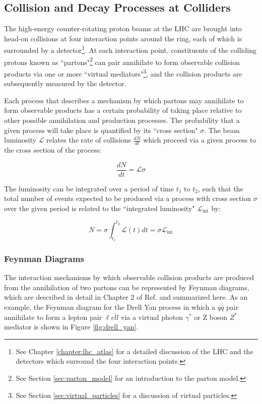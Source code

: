 \subsection{Collision and Decay Processes at Colliders}
\label{sec:col_decay_procs}

The high-energy counter-rotating proton beams at the LHC are brought into head-on collisions at four interaction points around the ring, each of which is surrounded by a detector\footnote{See Chapter \ref{chapter:lhc_atlas} for a detailed discussion of the LHC and the detectors which surround the four interaction points.}. At each interaction point, constituents of the colliding protons known as ``partons"\footnote{See Section \ref{sec:parton_model} for an introduction to the parton model.} can pair annihilate to form observable collision products via one or more ``virtual mediators"\footnote{See Section \ref{sec:virtual_particles} for a discussion of virtual particles.}, and the collision products are subsequently measured by the detector. 

Each process that describes a mechanism by which partons may annihilate to form observable products has a certain probability of taking place relative to other possible annihilation and production processes. The probability that a given process will take place is quantified by its ``cross section" \(\sigma\). The beam luminosity \(\mathcal{L}\) relates the rate of collisions \(\frac{dN}{dt}\) which proceed via a given process to the cross section of the process:

\begin{equation}
\frac{dN}{dt} = \mathcal{L}\sigma
\end{equation}

The luminosity can be integrated over a period of time \(t_1\) to \(t_2\), such that the total number of events expected to be produced via a process with cross section \(\sigma\) over the given period is related to the ``integrated luminosity" \(\mathcal{L}_\text{int}\) by:

\begin{equation}
\label{eq:integrated_lumi}
N = \sigma\int_{t_1}^{t_2}\mathcal{L}(t)dt = \sigma\mathcal{L}_\text{int}
\end{equation}

\subsubsection{Feynman Diagrams}

The interaction mechanisms by which observable collision products are produced from the annihilation of two partons can be represented by Feynman diagrams, which are described in detail in Chapter 2 of Ref. \cite{griffiths_2008} and summarized here. As an example, the Feynman diagram for the Drell Yan process in which a \(q\bar{q}\) pair annihilate to form a lepton pair \(\ell\bar{ell}\) via a virtual photon \(\gamma^{*}\) or Z boson \(Z^{*}\) mediator is shown in Figure \ref{fig:drell_yan}. 


